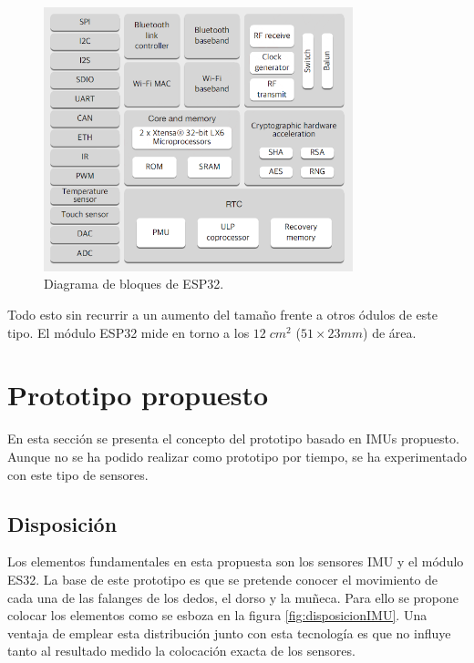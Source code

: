 	\begin{figure}[H]
		\centering
		\includegraphics[width=0.8\textwidth]{./img/esp32diagrama}
		\caption{Diagrama de bloques de ESP32. } 
		\label{fig:esp32tabla}
	\end{figure} 

Todo esto sin recurrir a un aumento del tamaño frente a otros ódulos de este tipo. El módulo ESP32 mide en torno a los $12\;cm^{2}$ ($ 51 \times 23 mm $) de área.


\section{Prototipo propuesto}
\label{sec:prototipo4}

En esta sección se presenta el concepto del prototipo basado en IMUs propuesto. Aunque no se ha podido realizar como prototipo por tiempo, se ha experimentado con este tipo de sensores.

\subsection{Disposición}
\label{sec:materiales4}

Los elementos fundamentales en esta propuesta son los sensores IMU y el módulo ES32. La base de este prototipo es que se pretende conocer el movimiento de cada una de las falanges de los dedos, el dorso y la muñeca. Para ello se propone colocar los elementos como se esboza en la figura \ref{fig:disposicionIMU}. Una ventaja de emplear esta distribución junto con esta tecnología es que no influye tanto al resultado medido la colocación exacta de los sensores. 


